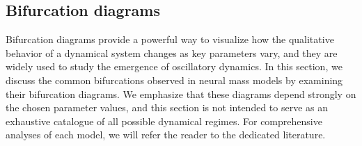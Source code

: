 \subsection{Bifurcation diagrams}

Bifurcation diagrams provide a powerful way to visualize how the qualitative behavior of a dynamical system changes as key parameters vary, and they are widely used to study the emergence of oscillatory dynamics. In this section, we discuss the common bifurcations observed in neural mass models by examining their bifurcation diagrams. We emphasize that these diagrams depend strongly on the chosen parameter values, and this section is not intended to serve as an exhaustive catalogue of all possible dynamical regimes. For comprehensive analyses of each model, we will refer the reader to the dedicated literature.

